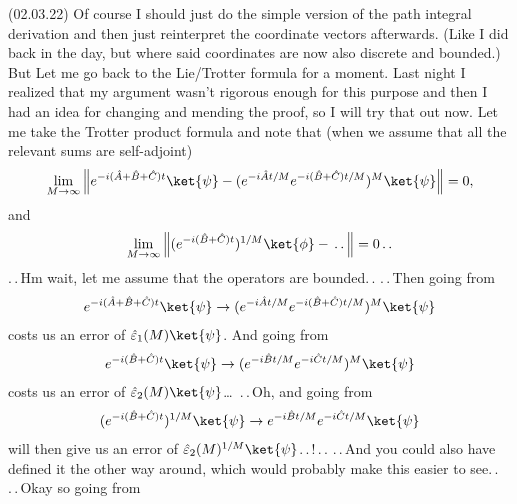 \documentclass{report}
\begin{document}
(02.03.22) Of course I should just do the simple version of the path integral derivation and then just reinterpret the coordinate vectors afterwards. (Like I did back in the day, but where said coordinates are now also discrete and bounded.) 
But Let me go back to the Lie/Trotter formula for a moment. Last night I realized that my argument wasn't rigorous enough for this purpose and then I had an idea for changing and mending the proof, so I will try that out now. Let me take the Trotter product formula and note that (when we assume that all the relevant sums are self-adjoint)
\begin{align}
\begin{aligned}
	\lim_{M \to \infty} \Big\|
		e^{-i (\hat A + \hat B + \hat C) t } \ket{\psi} - (
			e^{-i \hat A t / M } e^{-i (\hat B + \hat C) t / M}
		)^M \ket{\psi}
	\Big\| = 0,
\end{aligned}
\end{align} 
and
\begin{align}
\begin{aligned}
	\lim_{M \to \infty} \Big\|
		(e^{-i (\hat B + \hat C) t})^{1/M} \ket{\phi} -
		\,.\,.\,
	\Big\| = 0\,.\,.
\end{aligned}
\end{align} 
.\,.\,Hm wait, let me assume that the operators are bounded.\,. .\,.\,Then going from
\begin{align}
\begin{aligned}
	e^{-i (\hat A + \hat B + \hat C) t } \ket{\psi} \to
		(e^{-i \hat A t / M } e^{-i (\hat B + \hat C) t / M})^M \ket{\psi}
\end{aligned}
\end{align} 
costs us an error of $\hat \varepsilon_1(M)\ket{\psi}$. And going from 
\begin{align}
\begin{aligned}
	e^{-i (\hat B + \hat C) t } \ket{\psi} \to
		(e^{-i \hat B t / M } e^{-i \hat C t / M})^M \ket{\psi}
\end{aligned}
\end{align} 
costs us an error of $\hat \varepsilon_2(M)\ket{\psi}$\ldots\ .\,.\,Oh, and going from
\begin{align}
\begin{aligned}
	(e^{-i (\hat B + \hat C) t })^{1/M} \ket{\psi} \to
		e^{-i \hat B t / M } e^{-i \hat C t / M} \ket{\psi}
\end{aligned}
\end{align} 
will then give us an error of $\hat \varepsilon_2(M)^{1/M} \ket{\psi}$.\,.\,!\,.\,. .\,.\,And you could also have defined it the other way around, which would probably make this easier to see.\,. .\,.\,Okay so going from
\end{document}
